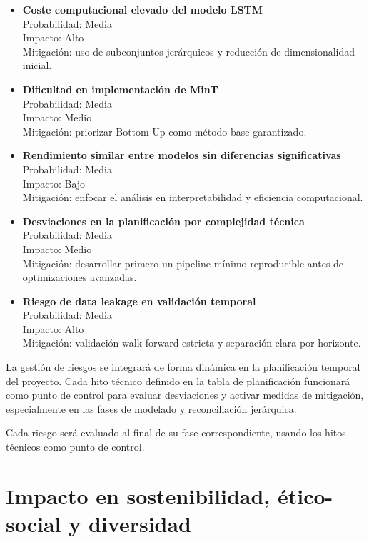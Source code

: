 \documentclass[IB,BIB]{TFUOC}%
\begin{document}
\begin{itemize}
\item
  \textbf{Coste computacional elevado del modelo LSTM}\\
  Probabilidad: Media\\
  Impacto: Alto\\
  Mitigación: uso de subconjuntos jerárquicos y reducción de
  dimensionalidad inicial.
\item
  \textbf{Dificultad en implementación de MinT}\\
  Probabilidad: Media\\
  Impacto: Medio\\
  Mitigación: priorizar Bottom-Up como método base garantizado.
\item
  \textbf{Rendimiento similar entre modelos sin diferencias
  significativas}\\
  Probabilidad: Media\\
  Impacto: Bajo\\
  Mitigación: enfocar el análisis en interpretabilidad y eficiencia
  computacional.
\item
  \textbf{Desviaciones en la planificación por complejidad técnica}\\
  Probabilidad: Media\\
  Impacto: Medio\\
  Mitigación: desarrollar primero un pipeline mínimo reproducible antes
  de optimizaciones avanzadas.
\item
  \textbf{Riesgo de data leakage en validación temporal\\
  }Probabilidad: Media\\
  Impacto: Alto\\
  Mitigación: validación walk-forward estricta y separación clara por
  horizonte.
\end{itemize}

La gestión de riesgos se integrará de forma dinámica en la planificación
temporal del proyecto. Cada hito técnico definido en la tabla de
planificación funcionará como punto de control para evaluar desviaciones
y activar medidas de mitigación, especialmente en las fases de modelado
y reconciliación jerárquica.

Cada riesgo será evaluado al final de su fase correspondiente, usando
los hitos técnicos como punto de control.

\newpage
\section{Impacto en sostenibilidad, ético-social y diversidad}
\end{document}
